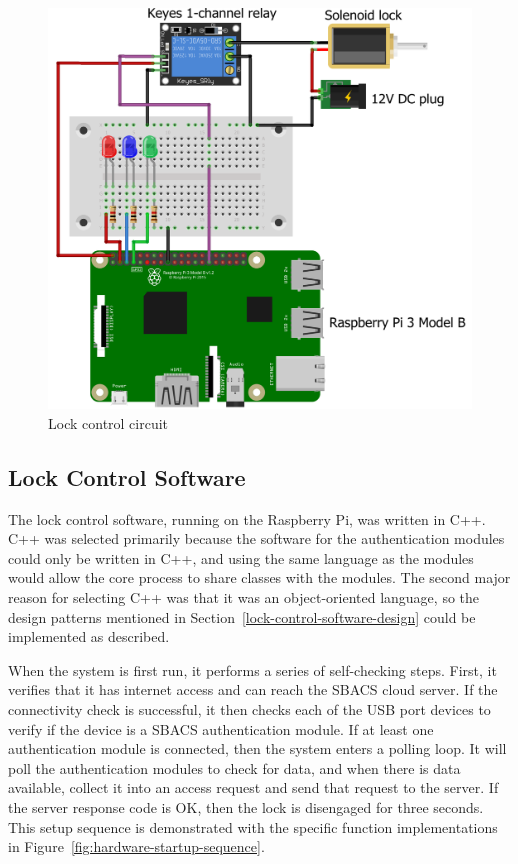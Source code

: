 \documentclass[12pt]{report}
\let\Oldsubsection\subsection
\renewcommand{\subsection}{\FloatBarrier\Oldsubsection}
\begin{document}
\begin{figure}
    \includegraphics[width=\textwidth]{Diagrams/Hardware-Diagrams/hardware_lock_control}
    \caption{Lock control circuit}
    \label{fig:lock-control-circuit-diagram}
\end{figure}

\subsection{Lock Control Software} \label{lock-control-software}

The lock control software, running on the Raspberry Pi, was written in C++. C++ was selected primarily because the 
software for the authentication modules could only be written in C++, and using the same language as the modules would 
allow the core process to share classes with the modules. The second major reason for selecting C++ was that it was an 
object-oriented language, so the design patterns mentioned in Section~\ref{lock-control-software-design} could be 
implemented as described.

When the system is first run, it performs a series of self-checking steps. First, it verifies that it has internet 
access and can reach the SBACS cloud server. If the connectivity check is successful, it then checks each of the USB 
port devices to verify if the device is a SBACS authentication module. If at least one authentication module is 
connected, then the system enters a polling loop. It will poll the authentication modules to check for data, and when 
there is data available, collect it into an access request and send that request to the server. If the server response 
code is OK, then the lock is disengaged for three seconds. This setup sequence is demonstrated with the specific 
function implementations in Figure~\ref{fig:hardware-startup-sequence}.
\end{document}
